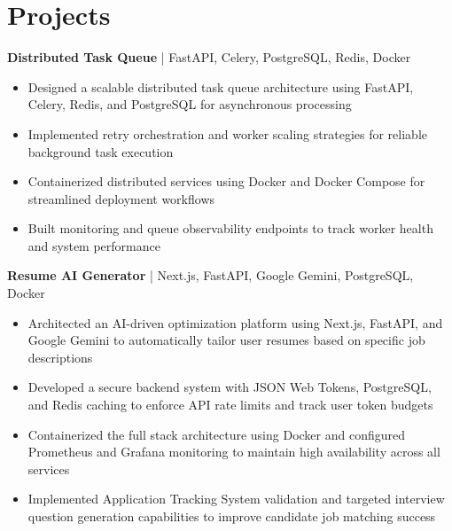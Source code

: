 \section*{Projects}
\textbf{Distributed Task Queue} | FastAPI, Celery, PostgreSQL, Redis, Docker \\
\vspace{-9pt}
\begin{itemize}
 \item Designed a scalable distributed task queue architecture using FastAPI, Celery, Redis, and PostgreSQL for asynchronous processing
 \item Implemented retry orchestration and worker scaling strategies for reliable background task execution
 \item Containerized distributed services using Docker and Docker Compose for streamlined deployment workflows
 \item Built monitoring and queue observability endpoints to track worker health and system performance
\end{itemize}


\textbf{Resume AI Generator} | Next.js, FastAPI, Google Gemini, PostgreSQL, Docker \\ %
\vspace{-9pt}
\begin{itemize}
  \item Architected an AI-driven optimization platform using Next.js, FastAPI, and Google Gemini to automatically tailor user resumes based on specific job descriptions
  \item Developed a secure backend system with JSON Web Tokens, PostgreSQL, and Redis caching to enforce API rate limits and track user token budgets
  \item Containerized the full stack architecture using Docker and configured Prometheus and Grafana monitoring to maintain high availability across all services
  \item Implemented Application Tracking System validation and targeted interview question generation capabilities to improve candidate job matching success
\end{itemize}


